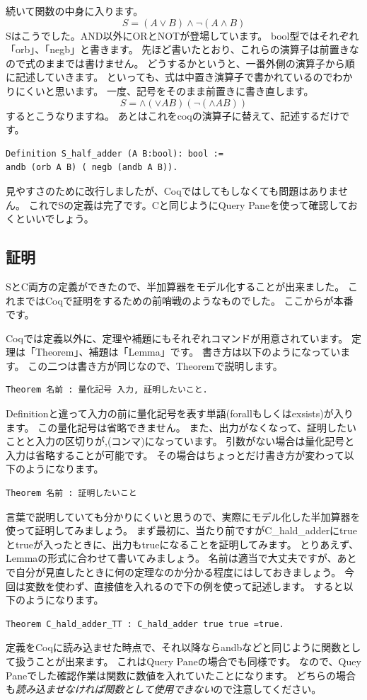\documentclass{jsbook}
\begin{document}
続いて関数の中身に入ります。
$$S=(A \vee B) \wedge \lnot (A \wedge B)$$
Sはこうでした。AND以外にORとNOTが登場しています。
bool型ではそれぞれ「orb」、「negb」と書きます。
先ほど書いたとおり、これらの演算子は前置きなので式のままでは書けません。
どうするかというと、一番外側の演算子から順に記述していきます。
といっても、式は中置き演算子で書かれているのでわかりにくいと思います。
一度、記号をそのまま前置きに書き直します。
$$S= \wedge (\vee  A B) (\lnot (\wedge A B))$$
するとこうなりますね。
あとはこれをcoqの演算子に替えて、記述するだけです。
\begin{verbatim}
Definition S_half_adder (A B:bool): bool :=
andb (orb A B) ( negb (andb A B)).
\end{verbatim}
見やすさのために改行しましたが、Coqではしてもしなくても問題はありません。
これでSの定義は完了です。Cと同じようにQuery Paneを使って確認しておくといいでしょう。

\subsection*{証明}
SとC両方の定義ができたので、半加算器をモデル化することが出来ました。
これまではCoqで証明をするための前哨戦のようなものでした。
ここからが本番です。

Coqでは定義以外に、定理や補題にもそれぞれコマンドが用意されています。
定理は「Theorem」、補題は「Lemma」です。
書き方は以下のようになっています。
この二つは書き方が同じなので、Theoremで説明します。
\begin{verbatim}
Theorem 名前 : 量化記号 入力, 証明したいこと.
\end{verbatim}
Definitionと違って入力の前に量化記号を表す単語(forallもしくはexsists)が入ります。
この量化記号は省略できません。
また、出力がなくなって、証明したいことと入力の区切りが,(コンマ)になっています。
引数がない場合は量化記号と入力は省略することが可能です。
その場合はちょっとだけ書き方が変わって以下のようになります。
\begin{verbatim}
Theorem 名前 : 証明したいこと
\end{verbatim}

言葉で説明していても分かりにくいと思うので、実際にモデル化した半加算器を使って証明してみましょう。
まず最初に、当たり前ですがC\_hald\_adderにtrueとtrueが入ったときに、出力もtrueになることを証明してみます。
とりあえず、Lemmaの形式に合わせて書いてみましょう。
名前は適当で大丈夫ですが、あとで自分が見直したときに何の定理なのか分かる程度にはしておきましょう。
今回は変数を使わず、直接値を入れるので下の例を使って記述します。
すると以下のようになります。
\begin{verbatim}
Theorem C_hald_adder_TT : C_hald_adder true true =true.
\end{verbatim}
定義をCoqに読み込ませた時点で、それ以降ならandbなどと同じように関数として扱うことが出来ます。
これはQuery Paneの場合でも同様です。
なので、Quey Paneでした確認作業は関数に数値を入れていたことになります。
どちらの場合も\emph{読み込ませなければ関数として使用できない}ので注意してください。
\end{document}
